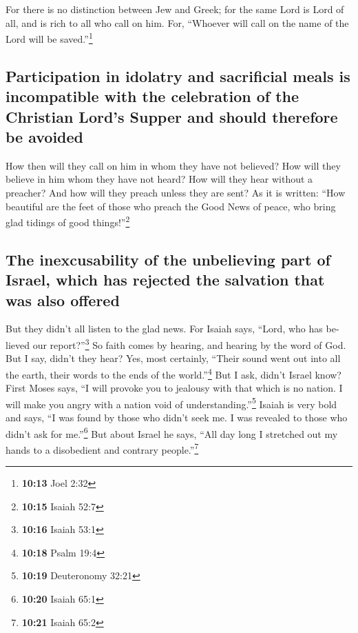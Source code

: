 \begin{paracol}{2}
\begin{otherlanguage}{english}
 For there is no distinction between Jew and Greek; for
the same Lord is Lord of all, and is rich to all who call on him.
 For, ``Whoever will call on the name of the Lord will be
saved.''\footnote{\textbf{10:13} Joel 2:32}

\hypertarget{participation-in-idolatry-and-sacrificial-meals-is-incompatible-with-the-celebration-of-the-christian-lords-supper-and-should-therefore-be-avoided}{%
\subsection{Participation in idolatry and sacrificial meals is
incompatible with the celebration of the Christian Lord's Supper and
should therefore be
avoided}\label{participation-in-idolatry-and-sacrificial-meals-is-incompatible-with-the-celebration-of-the-christian-lords-supper-and-should-therefore-be-avoided}}

 How then will they call on him in whom they have not
believed? How will they believe in him whom they have not heard? How
will they hear without a preacher?  And how will they
preach unless they are sent? As it is written: ``How beautiful are the
feet of those who preach the Good News of peace, who bring glad tidings
of good things!''\footnote{\textbf{10:15} Isaiah 52:7}

\hypertarget{the-inexcusability-of-the-unbelieving-part-of-israel-which-has-rejected-the-salvation-that-was-also-offered}{%
\subsection{The inexcusability of the unbelieving part of Israel, which
has rejected the salvation that was also
offered}\label{the-inexcusability-of-the-unbelieving-part-of-israel-which-has-rejected-the-salvation-that-was-also-offered}}

 But they didn't all listen to the glad news. For Isaiah
says, ``Lord, who has believed our report?''\footnote{\textbf{10:16}
  Isaiah 53:1}  So faith comes by hearing, and hearing by
the word of God.  But I say, didn't they hear? Yes, most
certainly, ``Their sound went out into all the earth, their words to the
ends of the world.''\footnote{\textbf{10:18} Psalm 19:4} 
But I ask, didn't Israel know? First Moses says, ``I will provoke you to
jealousy with that which is no nation. I will make you angry with a
nation void of understanding.''\footnote{\textbf{10:19} Deuteronomy
  32:21}  Isaiah is very bold and says, ``I was found by
those who didn't seek me. I was revealed to those who didn't ask for
me.''\footnote{\textbf{10:20} Isaiah 65:1}  But about
Israel he says, ``All day long I stretched out my hands to a disobedient
and contrary people.''\footnote{\textbf{10:21} Isaiah 65:2}


\end{otherlanguage}
\end{paracol}

